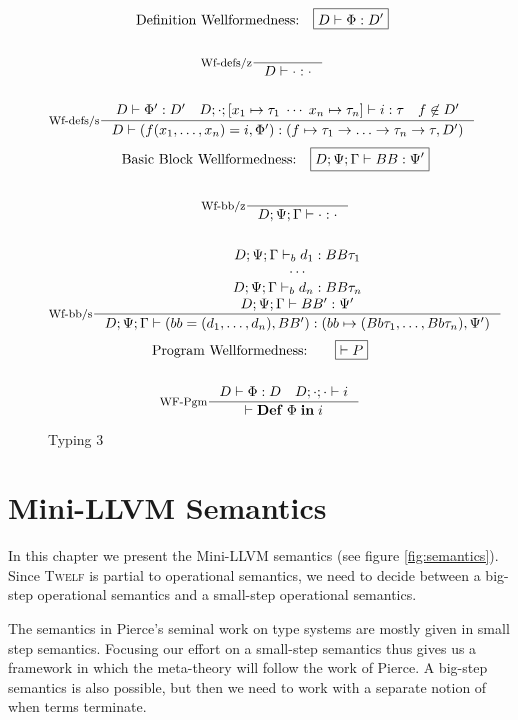 \documentclass[a4paper, oneside, 10pt, draft]{memoir}
\newcommand{\twelf}{\textsc{Twelf}}
\begin{document}
\begin{figure}
  \begin{gather*}
    \text{Definition Wellformedness:} \quad \boxed{D |- \Phi : D'}\\\\
    \inference[Wf-defs/z]{}{D |- \cdot : \cdot}\\\\
    \inference[Wf-defs/s]{D |- \Phi' : D' \quad D;\cdot;[x_1 \mapsto
      \tau_1 \; \dotsb \; x_n \mapsto \tau_n] |- i :
      \tau \quad f \not \in D'}{D |- (f(x_1, \dotsc, x_n) = i, \Phi') : (f
      \mapsto \tau_1 -> \dotsc -> \tau_n -> \tau, D')}
  \end{gather*}
  \begin{gather*}
    \text{Basic Block Wellformedness:} \quad \boxed{D;\Psi;\Gamma |-
    BB : \Psi'}\\\\
  \inference[Wf-bb/z]{}{D;\Psi;\Gamma |- \cdot : \cdot}\\\\
  \inference[Wf-bb/s]{D;\Psi;\Gamma \tpb d_1 : BB\tau_1\\
                      \dotsb\\
                      D;\Psi;\Gamma \tpb d_n : BB\tau_n\\
                      D;\Psi;\Gamma |- BB' : \Psi'}
                    {D;\Psi;\Gamma |- (bb = (d_1, \dotsc, d_n), BB') : (bb \mapsto
                      (Bb\tau_1,\dotsc,Bb\tau_n), \Psi')}
  \end{gather*}
  \begin{gather*}
    \text{Program Wellformedness:} \quad \quad \boxed{|- P}\\\\
    \inference[WF-Pgm]{D |- \Phi : D \quad D;\cdot;\cdot |- i}{|- \ipgm{\Phi}{i}}
  \end{gather*}
  \caption{Typing 3}
  \label{fig:type-judgement-3}
\end{figure}

\chapter{Mini-LLVM Semantics}

In this chapter we present the Mini-LLVM semantics (see figure
\ref{fig:semantics}). Since \twelf{} is partial to operational
semantics, we need to decide between a big-step operational semantics
and a small-step operational semantics.

The semantics in Pierce's seminal work \cite{pierce:2002:types} on
type systems are mostly given in small step semantics. Focusing our
effort on a small-step semantics thus gives us a framework in which
the meta-theory will follow the work of Pierce. A big-step semantics
is also possible, but then we need to work with a separate notion of
when terms terminate.
\end{document}
